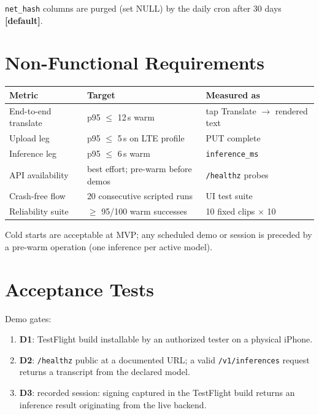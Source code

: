 \documentclass[11pt]{article}
\newcommand{\code}[1]{\texttt{#1}}
\begin{document}
\code{net\_hash} columns are purged (set NULL) by the daily cron after 30 days
\textbf{[default]}.

\section{Non-Functional Requirements}

\begin{center}
\begin{tabular}{@{}lll@{}}
\toprule
Metric & Target & Measured as \\
\midrule
End-to-end translate & p95 $\leq$ 12\,s warm & tap Translate $\to$ rendered text \\
Upload leg & p95 $\leq$ 5\,s on LTE profile & PUT complete \\
Inference leg & p95 $\leq$ 6\,s warm & \code{inference\_ms} \\
API availability & best effort; pre-warm before demos & \code{/healthz} probes \\
Crash-free flow & 20 consecutive scripted runs & UI test suite \\
Reliability suite & $\geq$ 95/100 warm successes & 10 fixed clips $\times$ 10 \\
\bottomrule
\end{tabular}
\end{center}

Cold starts are acceptable at MVP; any scheduled demo or session is preceded by a
pre-warm operation (one inference per active model).

\section{Acceptance Tests}
\label{sec:accept}

Demo gates:

\begin{enumerate}[nosep]
  \item \textbf{D1}: TestFlight build installable by an authorized tester on a
        physical iPhone.
  \item \textbf{D2}: \code{/healthz} public at a documented URL; a valid
        \code{/v1/inferences} request returns a transcript from the declared model.
  \item \textbf{D3}: recorded session: signing captured in the TestFlight build
        returns an inference result originating from the live backend.
\end{enumerate}
\end{document}
